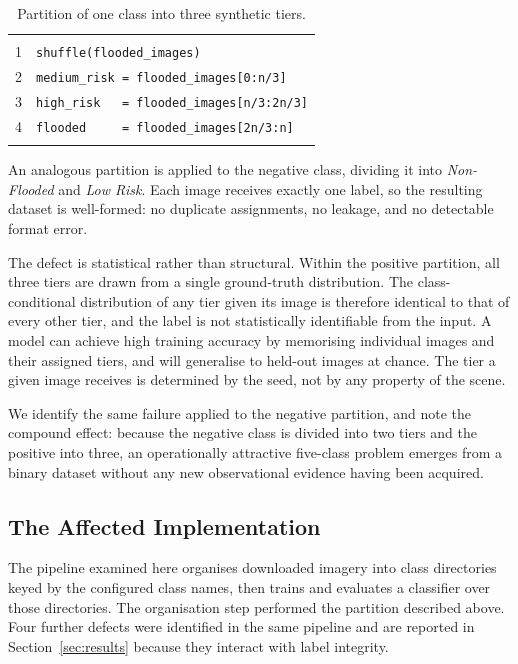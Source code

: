 \begin{table}[!t]
\caption{Partition of one class into three synthetic tiers.}
\label{tab:resplit}
\centering
\begin{tabular}{@{}r@{\,}l@{}}
\hline
\\[-6pt]
\rule{0pt}{11pt}1 & \texttt{shuffle(flooded\_images)}\\
\rule{0pt}{11pt}2 & \texttt{medium\_risk = flooded\_images[0:n/3]}\\
\rule{0pt}{11pt}3 & \texttt{high\_risk\ \ \ = flooded\_images[n/3:2n/3]}\\
\rule{0pt}{11pt}4 & \texttt{flooded\ \ \ \ \ = flooded\_images[2n/3:n]}\\
\\[-6pt]
\hline
\end{tabular}
\end{table}

An analogous partition is applied to the negative class, dividing it into
\emph{Non-Flooded} and \emph{Low Risk}. Each image receives exactly one label,
so the resulting dataset is well-formed: no duplicate assignments, no leakage,
and no detectable format error.

The defect is statistical rather than structural. Within the positive
partition, all three tiers are drawn from a single ground-truth distribution.
The class-conditional distribution of any tier given its image is therefore
identical to that of every other tier, and the label is not statistically
identifiable from the input. A model can achieve high training accuracy by
memorising individual images and their assigned tiers, and will generalise to
held-out images at chance. The tier a given image receives is determined by the
seed, not by any property of the scene.

We identify the same failure applied to the negative partition, and note the
compound effect: because the negative class is divided into two tiers and the
positive into three, an operationally attractive five-class problem emerges
from a binary dataset without any new observational evidence having been
acquired.

\subsection{The Affected Implementation}

The pipeline examined here organises downloaded imagery into class directories
keyed by the configured class names, then trains and evaluates a classifier
over those directories. The organisation step performed the partition described
above. Four further defects were identified in the same pipeline and are
reported in Section~\ref{sec:results} because they interact with label integrity.

